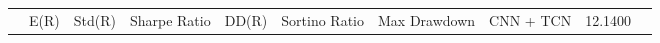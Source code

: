 \begin{tabular}{lrrrrrrrrr}
 & E(R) & Std(R) & Sharpe Ratio & DD(R) & Sortino Ratio & Max Drawdown & %
CNN + TCN & 12.1400%
\end{tabular}
